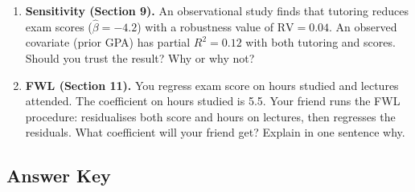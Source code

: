 \documentclass[11pt,a4paper]{article}
\theoremstyle{definition}
\theoremstyle{plain}
\theoremstyle{remark}
\newcommand{\bhat}{\hat{\beta}}
\begin{document}
\begin{enumerate}
\item \textbf{Sensitivity (Section 9).}
An observational study finds that tutoring reduces exam scores ($\bhat = -4.2$) with a robustness value of $\text{RV} = 0.04$. An observed covariate (prior GPA) has partial $R^2 = 0.12$ with both tutoring and scores. Should you trust the result? Why or why not?

\item \textbf{FWL (Section 11).}
You regress exam score on hours studied and lectures attended. The coefficient on hours studied is 5.5. Your friend runs the FWL procedure: residualises both score and hours on lectures, then regresses the residuals. What coefficient will your friend get? Explain in one sentence why.

\end{enumerate}

\subsection*{Answer Key}
\end{document}
